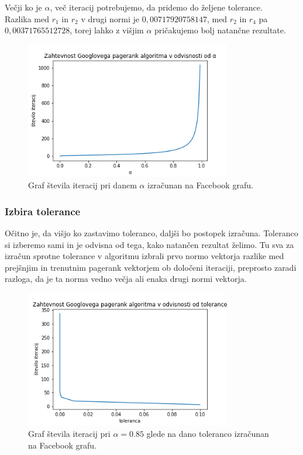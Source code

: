 \documentclass[a4paper]{article}
\begin{document}
Večji ko je $\alpha$, več iteracij potrebujemo, da pridemo do željene tolerance. \\
Razlika med $r_1$ in $r_2$ v drugi normi je $0,00717920758147$, med $r_2$ in $r_4$ pa $0,00371765512728$, torej lahko z višjim $\alpha$ pričakujemo bolj natančne rezultate.  
\begin{figure}[h]
\begin{center} 
\includegraphics[width=9cm]{Pagerank_alpha.png}
\caption[Zahtevnost Googlovega pagerank algoritma glede na $\alpha$]{Graf števila iteracij pri danem $\alpha$ izračunan na Facebook grafu.}
\end{center}
\end{figure}

\newpage

\subsubsection{Izbira tolerance} 
\hspace{4.8mm}Očitno je, da višjo ko zastavimo toleranco, daljši bo postopek izračuna. Toleranco si izberemo sami in je odvisna od tega, kako natančen rezultat želimo. Tu sva za izračun sprotne tolerance v algoritmu izbrali prvo normo vektorja razlike med prejšnjim in trenutnim pagerank vektorjem ob določeni iteraciji, preprosto zaradi razloga, da je ta norma vedno večja ali enaka drugi normi vektorja. \\
\begin{figure}[h]
\begin{center} 
\includegraphics[width=9cm]{Pagerank_tolerance.png}
	\caption[Zahtevnost Googlovega pagerank algoritma glede na toleranco]{Graf števila iteracij pri $\alpha = 0.85$ glede na dano toleranco izračunan na Facebook grafu.}
\end{center}
\end{figure}
\end{document}
